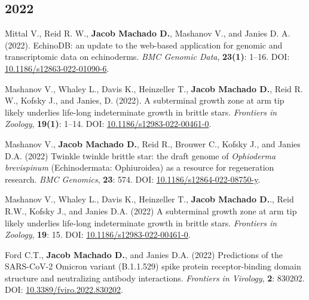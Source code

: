 \documentclass[11pt, letterpaper, sans]{moderncv}
\begin{document}

\subsection{2022}

	{\setlength{\parskip}{.5em}\renewcommand{\baselinestretch}{2.0}\begin{hangparas}{.25in}{1}

		Mittal V., Reid R. W., \textbf{Jacob Machado D.}, Mashanov V., and Janies D. A. (2022). EchinoDB: an update to the web-based application for genomic and transcriptomic data on echinoderms. \textit{BMC Genomic Data}, \textbf{23(1)}: 1--16. DOI: \href{https://doi.org/10.1186/s12863-022-01090-6}{10.1186/s12863-022-01090-6}.

		Mashanov V., Whaley L., Davis K., Heinzeller T., \textbf{Jacob Machado D.}, Reid R. W., Kofsky J., and Janies, D. (2022). A subterminal growth zone at arm tip likely underlies life-long indeterminate growth in brittle stars. \textit{Frontiers in Zoology}, \textbf{19(1)}: 1--14. DOI: \href{https://doi.org/10.1186/s12983-022-00461-0}{10.1186/s12983-022-00461-0}.

		Mashanov V., \textbf{Jacob Machado D.}, Reid R., Brouwer C., Kofsky J., and Janies D.A. (2022) Twinkle twinkle brittle star: the draft genome of \textit{Ophioderma brevispinum} (Echinodermata: Ophiuroidea) as a resource for regeneration research. \textit{BMC Genomics}, \textbf{23}: 574. DOI: \href{https://doi.org/10.1186/s12864-022-08750-y}{10.1186/s12864-022-08750-y}.

		Mashanov V., Whaley L., Davis K., Heinzeller T., \textbf{Jacob Machado D.}., Reid R.W., Kofsky J., and Janies D.A. (2022) A subterminal growth zone at arm tip likely underlies life-long indeterminate growth in brittle stars. \textit{Frontiers in Zoology}, \textbf{19}: 15. DOI: \href{https://doi.org/10.1186/s12983-022-00461-0}{10.1186/s12983-022-00461-0}.

		Ford C.T., \textbf{Jacob Machado D.}, and Janies D.A. (2022) Predictions of the SARS-CoV-2 Omicron variant (B.1.1.529) spike protein receptor-binding domain structure and neutralizing antibody interactions. \textit{Frontiers in Virology}, \textbf{2}: 830202. DOI: \href{https://doi.org/10.3389/fviro.2022.830202}{10.3389/fviro.2022.830202}.

	\end{hangparas}}

\end{document}
